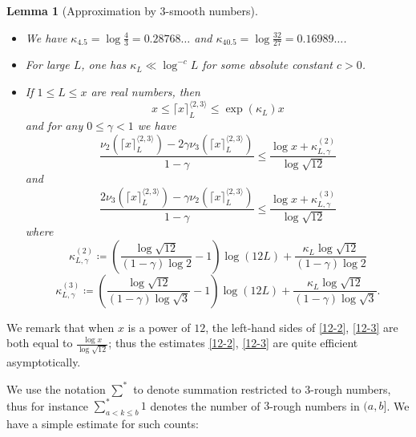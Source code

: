 \documentclass[12pt,a4paper,reqno]{amsart}
\numberwithin{equation}{section}
\theoremstyle{plain}
\newtheorem{lemma}[theorem]{Lemma}
\theoremstyle{definition}
\begin{document}
\begin{lemma}[Approximation by $3$-smooth numbers]\label{power-lemma}\ 
\begin{itemize}
\item[(i)]  We have $\kappa_{4.5} = \log\frac{4}{3} = 0.28768\dots$ and $\kappa_{40.5} = \log \frac{32}{27} = 0.16989\dots$.
\item[(ii)]  For large $L$, one has $\kappa_L \ll \log^{-c} L$ for some absolute constant $c>0$.
\item[(iii)]  If $1 \leq L \leq x$ are real numbers, then
\begin{equation}\label{mod-kappa}
  x \leq \lceil x \rceil^{\langle 2,3\rangle}_L \leq \exp(\kappa_L) x 
\end{equation}
and for any $0 \leq \gamma < 1$ we have
\begin{equation}\label{12-2}
\frac{\nu_2(\lceil x \rceil^{\langle 2,3\rangle}_L) - 2 \gamma \nu_3(\lceil x \rceil^{\langle 2,3\rangle}_L)}{1-\gamma} \leq \frac{\log x  + \kappa^{(2)}_{L,\gamma} }{\log \sqrt{12}} 
\end{equation}
and
\begin{equation}\label{12-3}
\frac{2\nu_3(\lceil x \rceil^{\langle 2,3\rangle}_L) - \gamma \nu_2(\lceil x \rceil^{\langle 2,3\rangle}_L)}{1-\gamma} \leq \frac{\log x + \kappa^{(3)}_{L,\gamma} }{\log \sqrt{12}} 
\end{equation}
where
\begin{equation}\label{kappastar-2-def}
\kappa^{(2)}_{L,\gamma} \coloneqq \left(\frac{\log \sqrt{12}}{(1-\gamma)\log 2} - 1\right) \log(12L) + \frac{\kappa_L\log \sqrt{12}}{(1-\gamma) \log 2}
\end{equation}
\begin{equation}\label{kappastar-3-def}
  \kappa^{(3)}_{L,\gamma} \coloneqq \left(\frac{\log \sqrt{12}}{(1-\gamma)\log \sqrt{3}} - 1\right) \log(12L) + \frac{\kappa_L\log \sqrt{12}}{(1-\gamma)\log \sqrt{3}}.
\end{equation}
\end{itemize}
\end{lemma}

We remark that when $x$ is a power of $12$, the left-hand sides of \eqref{12-2}, \eqref{12-3} are both equal to $\frac{\log x}{\log \sqrt{12}}$; thus the estimates \eqref{12-2}, \eqref{12-3} are quite efficient asymptotically.

We use the notation $\sum^*$ to denote summation restricted to $3$-rough numbers, thus for instance $\sum_{a < k \leq b}^* 1$ denotes the number of $3$-rough numbers in $(a,b]$.  We have a simple estimate for such counts:
\end{document}
